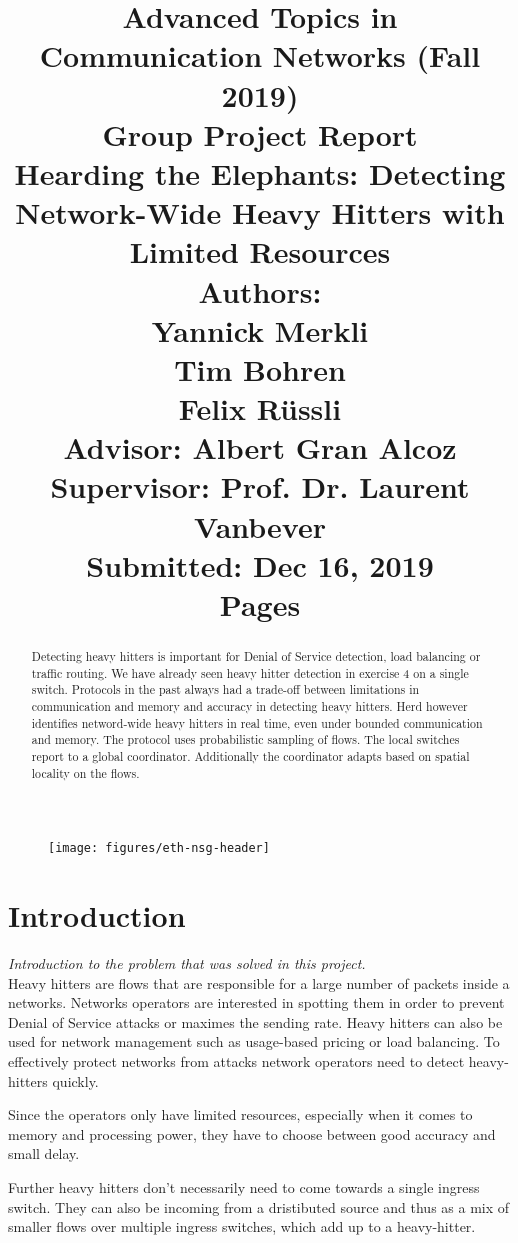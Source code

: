 \documentclass[11pt,oneside,a4paper]{article}
\title{
    \vspace*{0.0mm}
    \LARGE\bf\sf Advanced Topics in \\Communication Networks (Fall 2019)
    \vspace*{10.0mm} \\
    \Large\bf\sf Group Project Report \vspace*{30.0mm}\\
    \Huge\bf\sf Hearding the Elephants: Detecting Network-Wide Heavy Hitters with Limited Resources
    \vspace*{30.0mm} \\
    \normalsize
    \sf Authors:\\[5pt]
    \sf Yannick Merkli\\ [5pt]
    \sf Tim Bohren\\ [5pt]
    \sf Felix Rüssli \vspace*{5mm}\\
    \sf  Advisor: Albert Gran Alcoz \vspace*{5mm}\\
    \sf  Supervisor:  Prof. Dr. Laurent Vanbever \vspace*{20.0mm}\\
    \sf Submitted: Dec 16, 2019\\ [5pt]
    \sf \pageref{lastpage} Pages
}
\date{}
\newcommand{\hint}[1]{{\color{blue} \em #1}}
\begin{document}
\begin{figure}
    \texttt{[image: figures/eth-nsg-header]}
\end{figure}

\maketitle
\thispagestyle{empty}
\raggedbottom
\clearpage


\begin{abstract}
Detecting heavy hitters is important for Denial of Service detection, load balancing or traffic routing. We have already seen heavy hitter detection in exercise 4 on a single switch. Protocols in the past always had a trade-off between limitations in communication and memory and accuracy in detecting heavy hitters. Herd however identifies netword-wide heavy hitters in real time, even under bounded communication and memory. The protocol uses probabilistic sampling of flows. The local switches report to a global coordinator. Additionally the coordinator adapts based on spatial locality on the flows.
\end{abstract}

\clearpage
\setcounter{tocdepth}{2}
\tableofcontents
\clearpage
{}

\section{Introduction}
\hint{Introduction to the problem that was solved in this project.} \\
Heavy hitters are flows that are responsible for a large number of packets inside a networks. Networks operators are interested in spotting them in order to prevent Denial of Service attacks or maximes the sending rate. Heavy hitters can also be used for network management such as usage-based pricing or load balancing. To effectively protect networks from attacks network operators need to detect heavy-hitters quickly. 

Since the operators only have limited resources, especially when it comes to memory and processing power, they have to choose between good accuracy and small delay.

Further heavy hitters don't necessarily need to come towards a single ingress switch. They can also be incoming from a dristibuted source and thus as a mix of smaller flows over multiple ingress switches, which add up to a heavy-hitter. %
\end{document}

